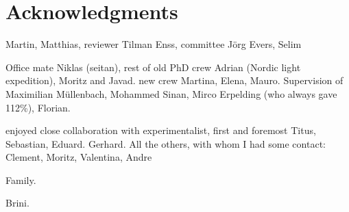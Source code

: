 
\bigskip

\begingroup
\let\clearpage\relax
\let\cleardoublepage\relax
\let\cleardoublepage\relax
\chapter*{Acknowledgments}
Martin, Matthias, reviewer Tilman Enss, committee Jörg Evers, Selim

Office mate Niklas (seitan), rest of old PhD crew Adrian (Nordic light expedition), Moritz and Javad. new crew Martina, Elena, Mauro. Supervision of Maximilian Müllenbach, Mohammed Sinan, Mirco Erpelding (who always gave 112\%), Florian.

enjoyed close collaboration with experimentalist, first and foremost Titus, Sebastian, Eduard. Gerhard. All the others, with whom I had some contact: Clement, Moritz, Valentina, Andre

Family. 

Brini.
\endgroup
